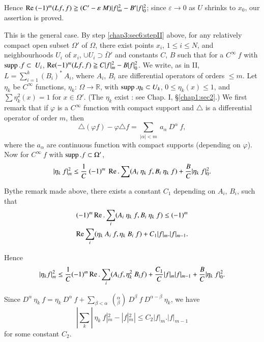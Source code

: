 Hence $\operatorname{Re} ~ (-1)^m (Lf, f) \geqq (C' - \varepsilon ~ M) | f |^2_m -
B' | f |^2_0$; since $\varepsilon \rightarrow 0$ as $U$ shrinks to
$x_0$, our assertion is proved. 

\begin{step}\label{chap3:sec6:stepIII}%
  This is the general case. By step \ref{chap3:sec6:stepII} above, for any relatively
  compact open subset $\Omega'$ of $\Omega$, there exist points $x_i$,
  $1 \leq i \leq N$, and neighbourhoods $U_i$ of $x_i$, $\cup U_i
  \supset \bar{\Omega}'$ and constants $C$, $B$ such that for a
  $C^\infty ~ f$ with $\operatorname{supp}. f \subset ~ U_i$, $\operatorname{Re} (-1)^m (Lf, f)
  \geqq C | f |^2_m - B | f |^2_0$. We write, as in II, $L
  =\sum\limits_{i=1}^k (B_i)^* ~ A_i$, where $A_i$, $B_i$ are
  differential operators of orders $\leq m$. Let $\eta_k$ be
  $C^\infty$ functions, $\eta_k$: $\Omega \rightarrow \mathbb{R}$,
  with $\operatorname{supp}. \eta_k \subset U_k$, $0 \leq \eta_k (x) \leq 1$, and
  $\sum  \eta^2_k (x) = 1$ for $x \in \Omega'$. (The $\eta_k$ exist :
  see Chap. I, \S \ref{chap1:sec2}.) We first remark that if $\varphi $ is a
  $C^\infty$ function with compact support and $\triangle$ is a
  differential operator of order $m$, then 
  $$
  \triangle (\varphi f) - \varphi \triangle f = \sum_{ | \alpha | < m}
  ~ a_\alpha ~ D^\alpha ~ f, 
  $$
  where the $a_\alpha$ are continuous function with compact supports
  (depending on $\varphi$). Now for $C^\infty ~f$ with $\operatorname{supp}. f
  \subset \Omega'$, 
  $$
  | \eta_k ~ f |^2_m \leq \frac{1}{C} ~(-1)^m ~ \operatorname{Re}. \sum (A_i  ~
  \eta_k ~ f, B_i ~ \eta_k ~f) + \frac{B}{C} | \eta_k ~ f |^2_0. 
  $$
\end{step}

By\pageoriginale the remark made above, there exists a constant $C_1$ depending on
$A_i$, $B_i$, such that  
\begin{multline*}
(-1)^m \operatorname{Re}. \sum_i (A_i ~ \eta_k ~ f, B_i ~ \eta_k ~ f) \leq (-1)^m\\
\operatorname{Re} \sum_i (\eta_k ~ A_i ~ f, \eta_k ~ B_i ~ f) + C_1 | f |_m . | f
|_{m-1}. 
\end{multline*}

Hence 
$$
| \eta_k f|^2_m \leq \frac{1}{C} (-1)^m \operatorname{Re}. \sum_i (A_i f, \eta^2_k ~
B_i f) + \frac{C_1}{C} |f|_m | f |_{m-1} + \frac{B}{C} | \eta_k ~ f
|^2_0. 
$$

Since $D^\alpha ~ \eta_k ~ f = \eta_k ~ D^\alpha ~ f +
\sum\limits_{\beta < \alpha} ~(^\alpha _\beta) ~ D^\beta ~ f ~
D^{\alpha - \beta} ~ \eta_k$, we have 
$$|\sum\limits_k | ~ \eta_k ~
f|^2_m - | f |^2_m | \leq C_2 | f |_m. | f |_{m-1}$$ 
for some constant $C_2$. 

